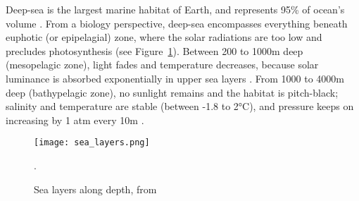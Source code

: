 




Deep-sea is the largest marine habitat of Earth, and represents 95\% of ocean's volume \citep{danovaro2017,salazar2016,webb2010}. From a biology perspective, deep-sea encompasses everything beneath euphotic (or epipelagial) zone, where the solar radiations are too low and precludes photosynthesis \citep{baker2020,danovaro2017,salazar2016} (see Figure~\ref{fig:dsl}). Between 200 to 1000m deep (mesopelagic zone), light fades and temperature decreases, because solar luminance is absorbed exponentially in upper sea layers \citep{reynolds2001}. From 1000 to 4000m deep (bathypelagic zone), no sunlight remains and the habitat is pitch-black; salinity and temperature are stable (between -1.8 to 2°C), and pressure keeps on increasing by 1 atm every 10m \citep{danovaro2017}. 

\begin{figure} [!htbp]
	\begin{center}
		\texttt{[image: sea\_layers.png]}
	\end{center}
	\caption[Sea layers]{Sea layers along depth, from \citep{fig_deep_sea}}.
	\label{fig:dsl}
\end{figure}

